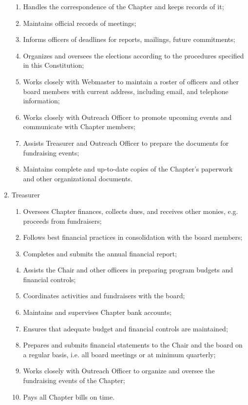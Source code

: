 \begin{enumerate}
	\begin{enumerate}
		\item Handles the correspondence of the Chapter and keeps records of it;
		\item Maintains official records of meetings;
		\item Informs officers of deadlines for reports, mailings, future commitments;
		\item Organizes and oversees the elections according to the procedures specified in this Constitution;
		\item Works closely with Webmaster to maintain a roster of officers and other board members with current address, including email, and telephone information;
		\item Works closely with Outreach Officer to promote upcoming events and communicate with Chapter members;
		\item Assists Treasurer and Outreach Officer to prepare the documents for fundraising events;
		\item Maintains complete and up-to-date copies of the Chapter's paperwork and other organizational documents.
	\end{enumerate}
	\item Treasurer
	\begin{enumerate}
		\item Oversees Chapter finances, collects dues, and receives other monies, e.g. proceeds from fundraisers;
		\item Follows best financial practices in consolidation with the board members;
		\item Completes and submits the annual financial report;
		\item Assists the Chair and other officers in preparing program budgets and financial controls;
		\item Coordinates activities and fundraisers with the board;
		\item Maintains and supervises Chapter bank accounts;
		\item Ensures that adequate budget and financial controls are maintained;
		\item Prepares and submits financial statements to the Chair and the board on a regular basis, i.e. all board meetings or at minimum quarterly;
		\item Works closely with Outreach Officer to organize and oversee the fundraising events of the Chapter;
		\item Pays all Chapter bills on time.
	\end{enumerate}

\end{enumerate}
